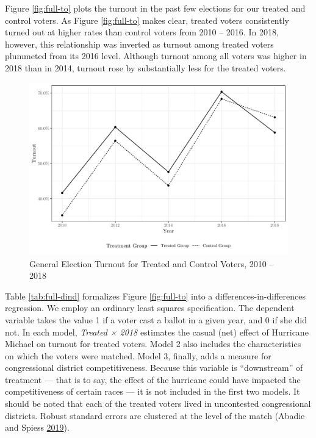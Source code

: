 \documentclass[
  12pt,
]{article}
\begin{document}
Figure \ref{fig:full-to} plots the turnout in the past few elections for our treated and control voters. As Figure \ref{fig:full-to} makes clear, treated voters consistently turned out at higher rates than control voters from 2010 -- 2016. In 2018, however, this relationship was inverted as turnout among treated voters plummeted from its 2016 level. Although turnout among all voters was higher in 2018 than in 2014, turnout rose by substantially less for the treated voters.

\begin{figure}[H]

{\centering \includegraphics{hurricane_michael_files/figure-latex/full-to-chunk-1} 

}

\caption{\label{fig:full-to}General Election Turnout for Treated and Control Voters, 2010 -- 2018}\label{fig:full-to-chunk}
\end{figure}

Table \ref{tab:full-dind} formalizes Figure \ref{fig:full-to} into a differences-in-differences regression. We employ an ordinary least squares specification. The dependent variable takes the value 1 if a voter cast a ballot in a given year, and 0 if she did not. In each model, \emph{Treated × 2018} estimates the casual (net) effect of Hurricane Michael on turnout for treated voters. Model 2 also includes the characteristics on which the voters were matched. Model 3, finally, adds a measure for congressional district competitiveness. Because this variable is ``downstream'' of treatment --- that is to say, the effect of the hurricane could have impacted the competitiveness of certain races --- it is not included in the first two models. It should be noted that each of the treated voters lived in uncontested congressional districts. Robust standard errors are clustered at the level of the match (Abadie and Spiess \protect\hyperlink{ref-Abadie2019}{2019}).
\end{document}
